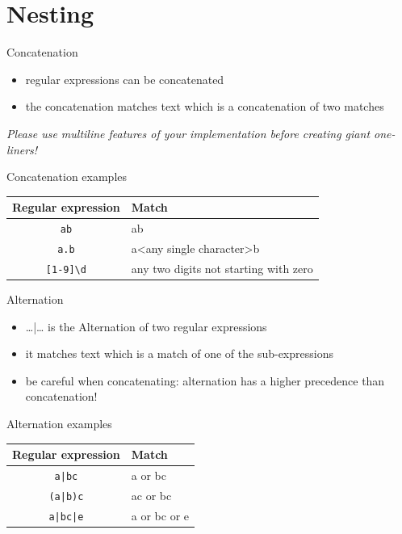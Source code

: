 \documentclass[10pt, graphics, aspectratio=169, table]{beamer}
\begin{document}
    \section{Nesting}
    \begin{frame}{Concatenation}
        \begin{itemize}
            \item regular expressions can be concatenated
            \item the concatenation matches text which is a concatenation of two matches
        \end{itemize}
        \emph{Please use multiline features of your implementation before creating giant one-liners!}
    \end{frame}

    \begin{frame}[fragile]{Concatenation examples}
        \begin{center}
            \begin{tabular}{cl}
                \toprule
                Regular expression & Match \\
                \midrule
                \verb|ab| & ab \\
                \verb|a.b| & a<any single character>b \\
                \verb|[1-9]\d| & any two digits not starting with zero \\
                \bottomrule
            \end{tabular}
        \end{center}
    \end{frame}

    \begin{frame}{Alternation}
        \begin{itemize}
            \item \ldots|\ldots{} is the Alternation of two regular expressions
            \item it matches text which is a match of one of the sub-expressions
            \item be careful when concatenating: alternation has a higher precedence than concatenation!
        \end{itemize}
    \end{frame}

    \begin{frame}[fragile]{Alternation examples}
        \begin{center}
            \begin{tabular}{cl}
                \toprule
                Regular expression & Match \\
                \midrule
                \verb!a|bc!  & a or bc \\
                \verb!(a|b)c! & ac or bc \\
                \verb!a|bc|e! & a or bc or e \\
                \bottomrule
            \end{tabular}
        \end{center}
    \end{frame}
\end{document}
